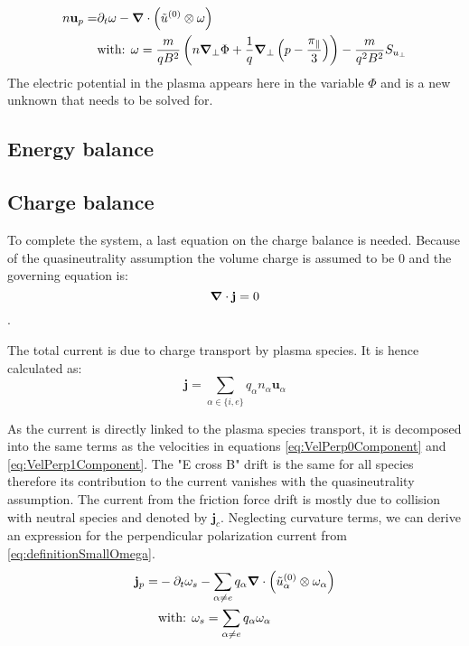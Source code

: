 \begin{align}
	n\mathbf{u}_{p} =& \partial_t\mathbf{\omega} - \grad\cdot\left(\tilde{u}^{(0)}\otimes\mathbf{\omega}\right) \nonumber \\
	&\text{with: } \mathbf{\omega} = \frac{m}{qB^2}\left(n\grad_\perp\Phi + \frac{1}{q}\grad_{\perp}\left(p-\frac{\pi_\parallel}{3}\right)\right) - \frac{m}{q^2B^2}S_{u_\perp} \label{eq:definitionSmallOmega}
\end{align}
The electric potential in the plasma appears here in the variable $\Phi$ and is a new unknown that needs to be solved for.





\subsection{Energy balance}


\subsection{Charge balance}
To complete the system, a last equation on the charge balance is needed. Because of the quasineutrality assumption the volume charge is assumed to be 0 and the governing equation is: $$\grad\cdot\mathbf{j} = 0$$.

The total current is due to charge transport by plasma species. It is hence calculated as: 
\begin{equation}
	\mathbf{j} = \sum_{\alpha \in \{i,e\}} q_\alpha n_\alpha \mathbf{u}_\alpha
\end{equation}

As the current is directly linked to the plasma species transport, it is decomposed into the same terms as the velocities in equations \ref{eq:VelPerp0Component} and \ref{eq:VelPerp1Component}. The "E cross B" drift is the same for all species therefore its contribution to the current vanishes with the quasineutrality assumption. The current from the friction force drift is mostly due to collision with neutral species and denoted by $\mathbf{j}_{c}$. Neglecting curvature terms, we can derive an expression for the perpendicular polarization current from \autoref{eq:definitionSmallOmega}.
\begin{align}
	\mathbf{j}_{p} =& -\partial_t\mathbf{\omega}_s - \sum_{\alpha\neq e}q_\alpha\grad\cdot\left(\tilde{u}^{(0)}_\alpha\otimes\mathbf{\omega}_\alpha\right) \\
	&\text{with:  }\mathbf{\omega}_s = \sum_{\alpha\neq e}q_\alpha\mathbf{\omega}_\alpha \nonumber
\end{align}


